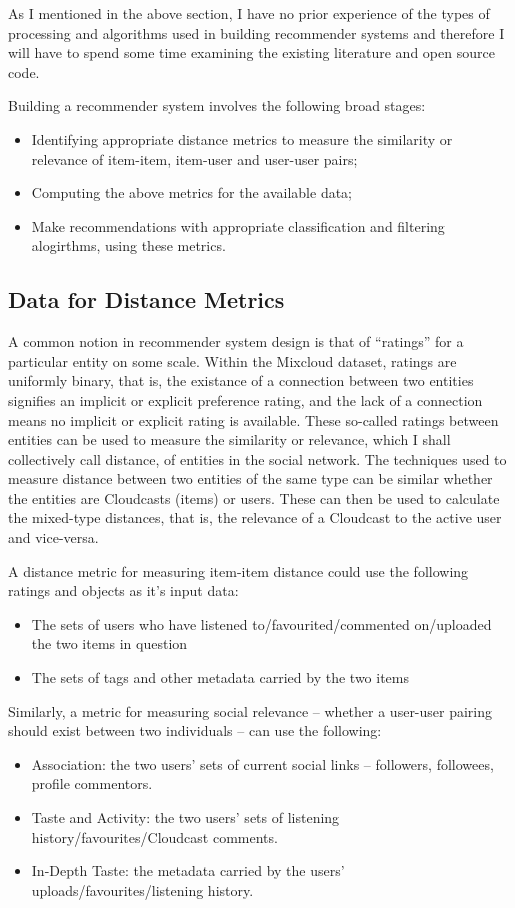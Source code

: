 As I mentioned in the above section, I have no prior experience of the types of processing and algorithms used in building recommender systems and therefore I will have to spend some time examining the existing literature and open source code.

Building a recommender system involves the following broad stages: 
\begin{itemize}
 \item Identifying appropriate distance metrics to measure the similarity or relevance of item-item, item-user and user-user pairs;
 \item Computing the above metrics for the available data;
 \item Make recommendations with appropriate classification and filtering alogirthms, using these metrics.
\end{itemize}

\subsection*{Data for Distance Metrics}

A common notion in recommender system design is that of ``ratings'' for a particular entity on some scale. Within the Mixcloud dataset, ratings are uniformly binary, that is, the existance of a connection between two entities signifies an implicit or explicit preference rating, and the lack of a connection means no implicit or explicit rating is available. These so-called ratings between entities can be used to measure the similarity or relevance, which I shall collectively call distance, of entities in the social network. The techniques used to measure distance between two entities of the same type can be similar whether the entities are Cloudcasts (items) or users. These can then be used to calculate the mixed-type distances, that is, the relevance of a Cloudcast to the active user and vice-versa.

A distance metric for measuring item-item distance could use the following ratings and objects as it's input data: 
\begin{itemize}
 \item The sets of users who have listened to/favourited/commented on/uploaded the two items in question
 \item The sets of tags and other metadata carried by the two items 
\end{itemize}


Similarly, a metric for measuring social relevance -- whether a user-user pairing should exist between two individuals -- can use the following:
\begin{itemize}
 \item Association: the two users' sets of current social links -- followers, followees, profile commentors. 
 \item Taste and Activity: the two users' sets of listening history/favourites/Cloudcast comments.
 \item In-Depth Taste: the metadata carried by the users' uploads/favourites/listening history.
\end{itemize}

